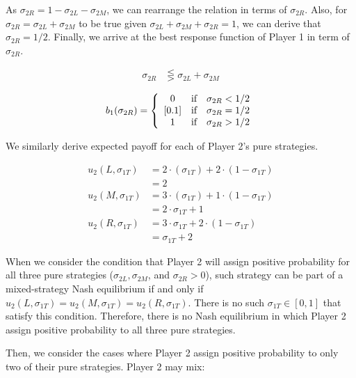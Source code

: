 \documentclass[10pt,a4paper]{article}
\begin{document}
As $\sigma_{2R} = 1 - \sigma_{2L} - \sigma_{2M}$, we can rearrange the relation in terms of $\sigma_{2R}$. Also, for $\sigma_{2R} = \sigma_{2L} + \sigma_{2M}$ to be true given $\sigma_{2L} + \sigma_{2M} + \sigma_{2R} =1$, we can derive that $\sigma_{2R} = 1/2$. Finally, we arrive at the best response function of Player 1 in term of $\sigma_{2R}$.

\begin{align*}
\sigma_{2R} &\lesseqgtr \sigma_{2L} + \sigma_{2M}
\end{align*}

\[
b_1(\sigma_{2R}) =
\left \{
  \begin{array}{ccc}
  0 & $if$ & \sigma_{2R} < 1/2 \\
  {[0.1]} & $if$ & \sigma_{2R} = 1/2 \\
  1 & $if$ & \sigma_{2R} > 1/2
  \end{array}
\right.
\]

We similarly derive expected payoff for each of Player 2's pure strategies.

\begin{align*}
u_2 (L, \sigma_{1T}) &= 2\cdot(\sigma_{1T}) + 2\cdot(1-\sigma_{1T}) \\
&= 2 \\
u_2 (M, \sigma_{1T}) &= 3\cdot(\sigma_{1T}) + 1\cdot(1-\sigma_{1T}) \\
&= 2\cdot\sigma_{1T} + 1 \\
u_2 (R, \sigma_{1T}) &= 3\cdot\sigma_{1T} + 2\cdot(1-\sigma_{1T}) \\
&= \sigma_{1T} + 2
\end{align*}

When we consider the condition that Player 2 will assign positive probability for all three pure strategies ($\sigma_{2L}, \sigma_{2M}$, and $\sigma_{2R} > 0$), such strategy can be part of a mixed-strategy Nash equilibrium if and only if $u_2(L, \sigma_{1T}) = u_2(M, \sigma_{1T}) = u_2(R, \sigma_{1T})$. There is no such $\sigma_{1T} \in {[0,1]}$ that satisfy this condition. Therefore, there is no Nash equilibrium in which Player 2 assign positive probability to all three pure strategies.

Then, we consider the cases where Player 2 assign positive probability to only two of their pure strategies. Player 2 may mix:
\end{document}
